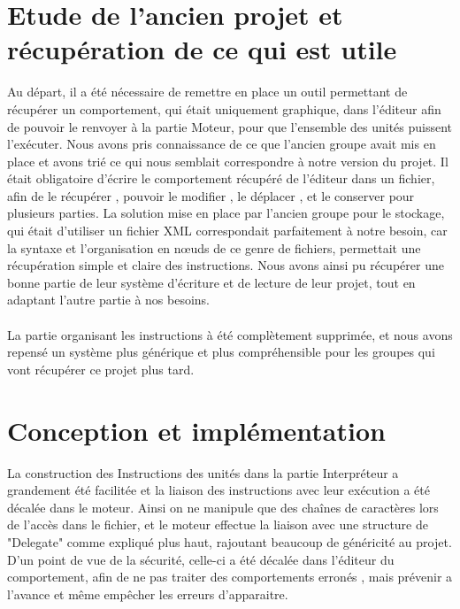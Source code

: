 \documentclass{report}
\begin{document}
\section{Etude de l'ancien projet et récupération de ce qui est utile}
Au départ, il a été nécessaire de remettre en place un outil permettant de récupérer un comportement, qui était uniquement graphique, dans l'éditeur afin de pouvoir le renvoyer à la partie Moteur, pour que l'ensemble des unités puissent l'exécuter.
Nous avons pris connaissance de ce que l'ancien groupe avait mis en place et avons trié ce qui nous semblait correspondre à notre version du projet.
Il était obligatoire d'écrire le comportement récupéré de l'éditeur dans un fichier, afin de le récupérer , pouvoir le modifier , le déplacer , et le conserver pour plusieurs parties.
La solution mise en place par l'ancien groupe pour le stockage, qui était d'utiliser un fichier XML correspondait parfaitement à notre besoin, car la syntaxe et l'organisation en nœuds de ce genre de fichiers, permettait une récupération simple et claire des instructions. Nous avons ainsi pu récupérer une bonne partie de leur système d'écriture et de lecture de leur projet, tout en adaptant l'autre partie à nos besoins.
\paragraph{}
\newpage
La partie organisant les instructions à été complètement supprimée, et nous avons repensé un système plus générique et plus compréhensible pour les groupes qui vont récupérer ce projet plus tard.
\section{Conception et implémentation}
La construction des Instructions des unités dans la partie Interpréteur a grandement été facilitée et la liaison des instructions avec leur exécution a été décalée dans le moteur. Ainsi on ne manipule que des chaînes de caractères lors de l'accès dans le fichier, et le moteur effectue la liaison avec une structure de "Delegate" comme expliqué plus haut, rajoutant beaucoup de généricité au projet.
D'un point de vue de la sécurité, celle-ci a été décalée dans l'éditeur du comportement, afin de ne pas traiter des comportements erronés , mais prévenir a l'avance et même empêcher les erreurs d'apparaitre.
\end{document}
